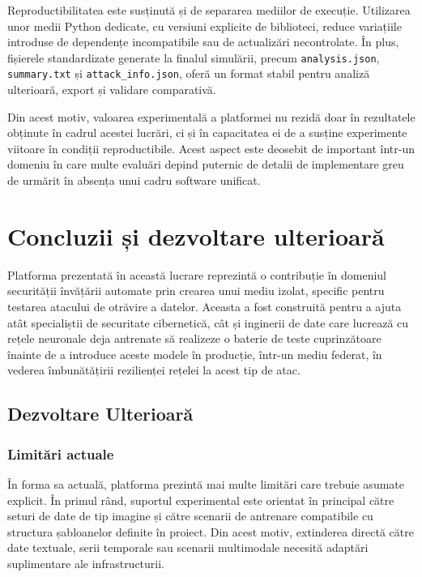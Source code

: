 \documentclass[../../main.tex]{subfiles}
\begin{document}
        Reproductibilitatea este susținută și de separarea mediilor de execuție. Utilizarea unor medii Python dedicate, cu versiuni explicite de biblioteci, reduce variațiile introduse de dependențe incompatibile sau de actualizări necontrolate. În plus, fișierele standardizate generate la finalul simulării, precum \texttt{analysis.\-json}, \texttt{summary.txt} și \texttt{attack\_info.json}, oferă un format stabil pentru analiză ulterioară, export și validare comparativă.

        Din acest motiv, valoarea experimentală a platformei nu rezidă doar în rezultatele obținute în cadrul acestei lucrări, ci și în capacitatea ei de a susține experimente viitoare în condiții reproductibile. Acest aspect este deosebit de important într-un domeniu în care multe evaluări depind puternic de detalii de implementare greu de urmărit în absența unui cadru software unificat.

\chapter{Concluzii și dezvoltare ulterioară}

	    Platforma prezentată în această lucrare reprezintă o contribuție în domeniul securității învățării automate prin crearea unui mediu izolat, specific pentru
	    testarea atacului de otrăvire a datelor. Aceasta a fost construită pentru a ajuta atât specialiștii de securitate cibernetică, cât și inginerii de date care
	    lucrează cu rețele neuronale deja antrenate să realizeze o baterie de teste cuprinzătoare înainte de a introduce aceste modele în producție, într-un mediu federat,
	    în vederea îmbunătățirii rezilienței rețelei la acest tip de atac.

    \section{Dezvoltare Ulterioară}

    \subsection{Limitări actuale}

    În forma sa actuală, platforma prezintă mai multe limitări care trebuie asumate explicit. În primul rând, suportul experimental este orientat în principal către seturi de date de tip imagine și către scenarii de antrenare compatibile cu structura șabloanelor definite în proiect. Din acest motiv, extinderea directă către date textuale, serii temporale sau scenarii multimodale necesită adaptări suplimentare ale infrastructurii.
\end{document}
